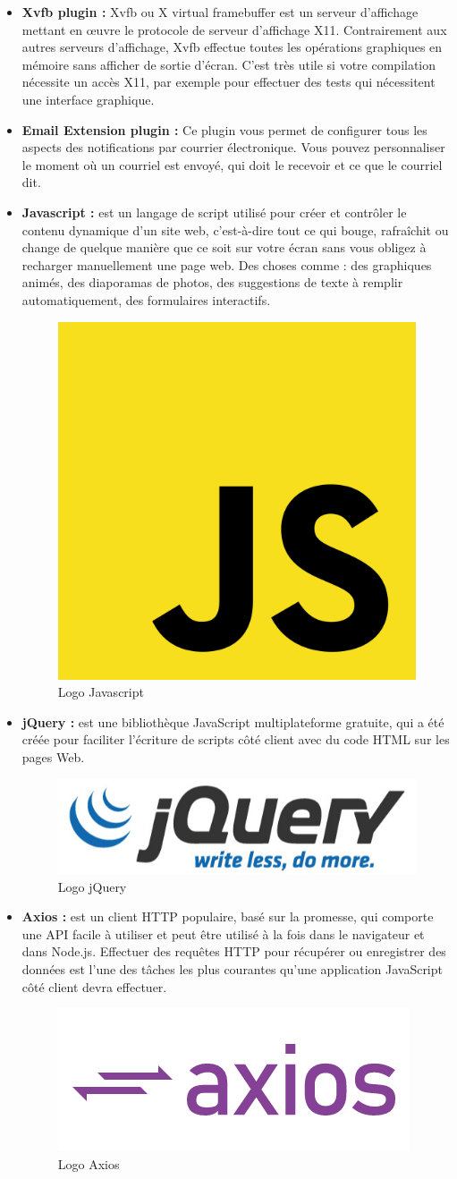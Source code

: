\begin{itemize}
	\item \textbf{Xvfb plugin\cite{xvfb} : } Xvfb ou X virtual framebuffer est un serveur d'affichage mettant en œuvre le protocole de serveur d'affichage X11. Contrairement aux autres serveurs d'affichage, Xvfb effectue toutes les opérations graphiques en mémoire sans afficher de sortie d'écran. C'est très utile si votre compilation nécessite un accès X11, par exemple pour effectuer des tests qui nécessitent une interface graphique.
	\item \textbf{Email Extension plugin\cite{emailextension} :} Ce plugin vous permet de configurer tous les aspects des notifications par courrier électronique. Vous pouvez personnaliser le moment où un courriel est envoyé, qui doit le recevoir et ce que le courriel dit.
	\item \textbf{Javascript\cite{js} :} est un langage de script utilisé pour créer et contrôler le contenu dynamique d'un site web, c'est-à-dire tout ce qui bouge, rafraîchit ou change de quelque manière que ce soit sur votre écran sans vous obligez à recharger manuellement une page web. Des choses comme : des graphiques animés, des diaporamas de photos, des suggestions de texte à remplir automatiquement, des formulaires interactifs.
	\begin{figure}[H]
		\centering
		\includegraphics[width=0.13\linewidth]{img/logos/js}
		\caption[Logo Javascript]{Logo Javascript}
		\label{fig:js}
	\end{figure}
	
	\item \textbf{jQuery\cite{jquery} :} est une bibliothèque JavaScript multiplateforme gratuite, qui a été créée pour faciliter l'écriture de scripts côté client avec du code HTML sur les pages Web.
	\begin{figure}[H]
		\centering
		\includegraphics[width=0.2\linewidth]{img/logos/jquery}
		\caption[Logo jQuery]{Logo jQuery}
		\label{fig:jquery}
	\end{figure}
	
	\item \textbf{Axios\cite{axios} :} est un client HTTP populaire, basé sur la promesse, qui comporte une API facile à utiliser et peut être utilisé à la fois dans le navigateur et dans Node.js. Effectuer des requêtes HTTP pour récupérer ou enregistrer des données est l'une des tâches les plus courantes qu'une application JavaScript côté client devra effectuer.
	\begin{figure}[H]
		\centering
		\includegraphics[width=0.2\linewidth]{img/logos/axios}
		\caption[Logo Axios]{Logo Axios}
		\label{fig:axios}
	\end{figure}
	

\end{itemize}
